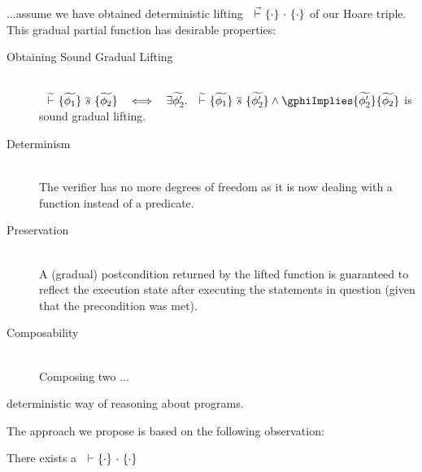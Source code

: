 ...assume we have obtained deterministic lifting ${~} \,\,\vec{\vdash}\,\, \{{\cdot}\} ~{\cdot}~ \{{\cdot}\}$ of our Hoare triple. %
This gradual partial function has desirable properties:
\begin{description}
    \item[Obtaining Sound Gradual Lifting]
    \begin{lemma}~\\
        $\gthoare {~} {\grad{\phi_1}} {\overline{s}} {\grad{\phi_2}} ~~\iff~~ \exists \grad{\phi_2'}.~ \gthoare {~} {\grad{\phi_1}} {\overline{s}} {\grad{\phi_2'}} \wedge \gphiImplies {\grad{\phi_2'}} {\grad{\phi_2}}$
        is sound gradual lifting.
    \end{lemma}
    
    \item[Determinism]~\\
    The verifier has no more degrees of freedom as it is now dealing with a function instead of a predicate. %
    \item[Preservation]~\\
    A (gradual) postcondition returned by the lifted function is guaranteed to reflect the execution state after executing the statements in question (given that the precondition was met).
    \item[Composability]~\\
    Composing two ...
\end{description}

 deterministic way of reasoning about programs.



The approach we propose is based on the following observation:
\begin{lemma}
    There exists a 
    ${~} \vdash \{{\cdot}\} ~{\cdot}~ \{{\cdot}\}$
\end{lemma}